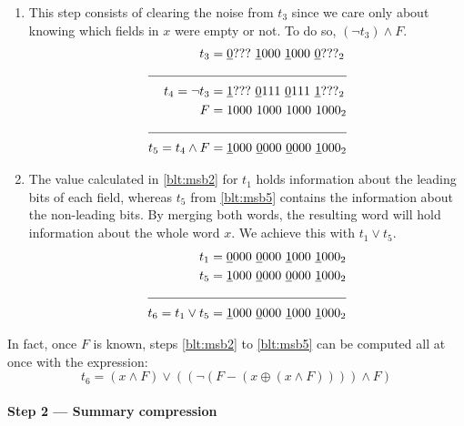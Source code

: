 \begin{enumerate}
    \item \label{blt:msb5}
    This step consists of clearing the noise from $t_3$ since we care only about knowing which fields in $x$ were empty or not. To do so, $(\neg t_3) \wedge F$.
    \begin{align*}
                       t_3 &= \underline{0}???\ \underline{1}000\ \underline{1}000\ \underline{0}???_2 \\ \cline{1-2} 
            t_4 = \neg t_3 &= \underline{1}???\ \underline{0}111\ \underline{0}111\ \underline{1}???_2 \\
                         F &= 1000\ 1000\ 1000\ 1000_2 \\ \cline{1-2} 
        t_5 = t_4 \wedge F &= \underline{1}000\ \underline{0}000\ \underline{0}000\ \underline{1}000_2
    \end{align*}
    
    \item \label{blt:msb6}
    The value calculated in \ref{blt:msb2} for $t_1$ holds information about the leading bits of each field, whereas $t_5$ from \ref{blt:msb5} contains the information about the non-leading bits. By merging both words, the resulting word will hold information about the whole word $x$. We achieve this with $t_1 \vee t_5$.
    \begin{align*}
                       t_1 &= \underline{0}000\ \underline{0}000\ \underline{1}000\ \underline{1}000_2 \\
                       t_5 &= \underline{1}000\ \underline{0}000\ \underline{0}000\ \underline{1}000_2 \\ \cline{1-2} 
        t_6 = t_1 \vee t_5 &= \underline{1}000\ \underline{0}000\ \underline{1}000\ \underline{1}000_2
    \end{align*}
\end{enumerate}

In fact, once $F$ is known, steps \ref{blt:msb2} to \ref{blt:msb5} can be computed all at once with the expression:
\begin{equation}
    t_6 = (x \wedge F) \vee ((\neg(F - (x \oplus(x \wedge F)))) \wedge F)
\end{equation}

\paragraph{Step 2 --- Summary compression} \label{sec:summaryCompression}

